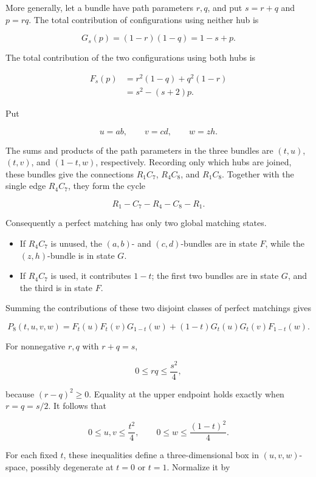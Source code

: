 \documentclass[11pt]{article}
\theoremstyle{definition}
\begin{document}
More generally, let a bundle have path parameters \(r,q\), and put
\(s=r+q\) and \(p=rq\). The total contribution of configurations using
neither hub is

\[
G_s(p)=(1-r)(1-q)=1-s+p.
\]

The total contribution of the two configurations using both hubs is

\[
\begin{aligned}
F_s(p)
&=r^2(1-q)+q^2(1-r)\\
&=s^2-(s+2)p.
\end{aligned}                                             \tag{3.3}
\]

Put

\[
u=ab,\qquad v=cd,\qquad w=zh.                             \tag{3.4}
\]

The sums and products of the path parameters in the three bundles are
\((t,u)\), \((t,v)\), and \((1-t,w)\), respectively. Recording only which
hubs are joined, these bundles give the connections \(R_1C_7\), \(R_4C_8\),
and \(R_1C_8\). Together with the single edge \(R_4C_7\), they form the cycle

\[
R_1-C_7-R_4-C_8-R_1.
\]

Consequently a perfect matching has only two global matching states.

\begin{itemize}
\item If \(R_4C_7\) is unused, the \((a,b)\)- and \((c,d)\)-bundles are in
state \(F\), while the \((z,h)\)-bundle is in state \(G\).
\item If \(R_4C_7\) is used, it contributes \(1-t\); the first two bundles
are in state \(G\), and the third is in state \(F\).
\end{itemize}

Summing the contributions of these two disjoint classes of perfect matchings
gives

\[
P_8(t,u,v,w)
=F_t(u)F_t(v)G_{1-t}(w)
 +(1-t)G_t(u)G_t(v)F_{1-t}(w).                           \tag{3.5}
\]

For nonnegative \(r,q\) with \(r+q=s\),

\[
0\le rq\le\frac{s^2}{4},                                \tag{3.6}
\]

because \((r-q)^2\ge0\). Equality at the upper endpoint holds exactly when
\(r=q=s/2\). It follows that

\[
0\le u,v\le\frac{t^2}{4},
\qquad 0\le w\le\frac{(1-t)^2}{4}.
\]

For each fixed \(t\), these inequalities define a three-dimensional box in
\((u,v,w)\)-space, possibly degenerate at \(t=0\) or \(t=1\). Normalize it by
\end{document}
